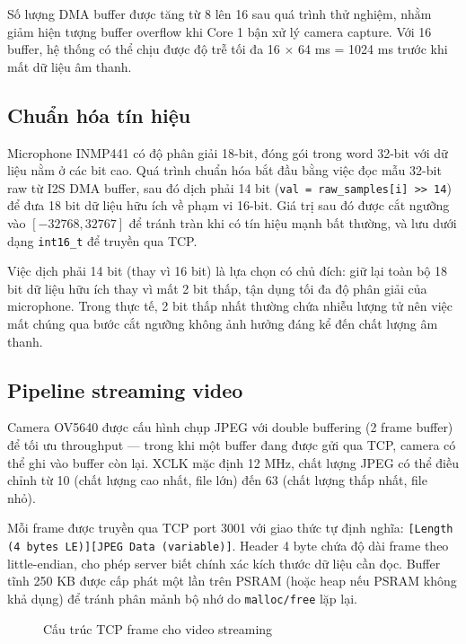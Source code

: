 Số lượng DMA buffer được tăng từ 8 lên 16 sau quá trình thử nghiệm, nhằm
giảm hiện tượng buffer overflow khi Core 1 bận xử lý camera capture. Với 16
buffer, hệ thống có thể chịu được độ trễ tối đa 16 $\times$ 64 ms = 1024 ms
trước khi mất dữ liệu âm thanh.

\subsection{Chuẩn hóa tín hiệu}

Microphone INMP441 có độ phân giải 18-bit, đóng gói trong word 32-bit với dữ liệu
nằm ở các bit cao. Quá trình chuẩn hóa bắt đầu bằng việc đọc mẫu 32-bit raw
từ I2S DMA buffer, sau đó dịch phải 14 bit
(\texttt{val = raw\_samples[i] >> 14}) để đưa 18 bit dữ liệu hữu ích về
phạm vi 16-bit. Giá trị sau đó được cắt ngưỡng vào $[-32768, 32767]$ để tránh
tràn khi có tín hiệu mạnh bất thường, và lưu dưới dạng \texttt{int16\_t}
để truyền qua TCP.

Việc dịch phải 14 bit (thay vì 16 bit) là lựa chọn có chủ đích: giữ lại
toàn bộ 18 bit dữ liệu hữu ích thay vì mất 2 bit thấp, tận dụng tối đa
độ phân giải của microphone. Trong thực tế, 2 bit thấp nhất thường chứa
nhiễu lượng tử nên việc mất chúng qua bước cắt ngưỡng không ảnh hưởng
đáng kể đến chất lượng âm thanh.

\subsection{Pipeline streaming video}

Camera OV5640 được cấu hình chụp JPEG với double buffering (2 frame buffer)
để tối ưu throughput --- trong khi một buffer đang được gửi qua TCP, camera
có thể ghi vào buffer còn lại. XCLK mặc định 12 MHz, chất lượng JPEG có
thể điều chỉnh từ 10 (chất lượng cao nhất, file lớn) đến 63 (chất lượng
thấp nhất, file nhỏ).

Mỗi frame được truyền qua TCP port 3001 với giao thức tự định nghĩa:
\texttt{[Length (4 bytes LE)][JPEG Data (variable)]}. Header 4 byte chứa
độ dài frame theo little-endian, cho phép server biết chính xác kích thước
dữ liệu cần đọc. Buffer tĩnh 250 KB được cấp phát một lần trên PSRAM
(hoặc heap nếu PSRAM không khả dụng) để tránh phân mảnh bộ nhớ do
\texttt{malloc/free} lặp lại.

\begin{figure}[htbp]
\centering
{}
\caption{Cấu trúc TCP frame cho video streaming}
\label{fig:tcp-frame}
\end{figure}

